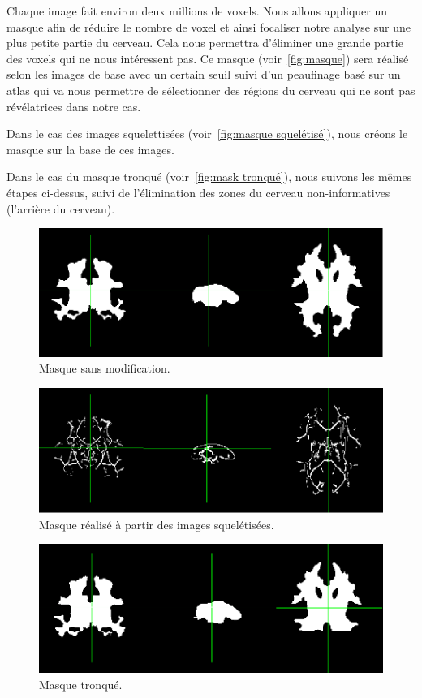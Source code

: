 Chaque image fait environ deux millions de voxels. Nous allons appliquer un masque afin de réduire le nombre de voxel et ainsi focaliser notre analyse sur une plus petite partie du cerveau. Cela nous permettra d'éliminer une grande partie des voxels qui ne nous intéressent pas. 
Ce masque (voir~\autoref{fig:masque}) sera réalisé selon les images de base avec un certain seuil suivi d'un peaufinage basé sur un atlas qui va nous permettre de sélectionner des régions du cerveau qui ne sont pas révélatrices dans notre cas. 

Dans le cas des images squelettisées (voir~\autoref{fig:masque squelétisé}), nous créons le masque sur la base de ces images. 

Dans le cas du masque tronqué (voir~\autoref{fig:mask tronqué}), nous suivons les mêmes étapes ci-dessus, suivi de l'élimination des zones du cerveau non-informatives (l'arrière du cerveau).



\begin{figure}[h]
	\centering
	\includegraphics[scale = 0.5]{images/mask}
	\caption{Masque sans modification.}
	\label{fig:masque}
\end{figure}

\begin{figure}[h]
	\centering
	\includegraphics[scale = 0.5]{images/mask_skel}
	\caption{Masque réalisé à partir des images squelétisées.}
	\label{fig:masque squelétisé}
\end{figure}
  	
\begin{figure}[t]
	\centering
	\includegraphics[scale = 0.5]{images/mask_trunk}
	\caption{Masque tronqué.}
	\label{fig:mask tronqué}
\end{figure}



